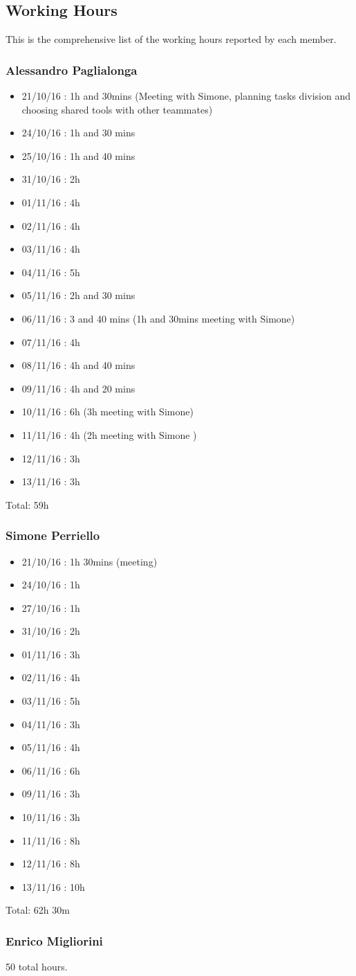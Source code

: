 \clearpage
\subsection{Working Hours}
This is the comprehensive list of the working hours reported by each member.

\subsubsection{Alessandro Paglialonga}
\begin{itemize}
\item21/10/16 : 1h and 30mins (Meeting with Simone, planning tasks division and choosing shared tools with other teammates)
\item24/10/16 : 1h and 30 mins 
\item25/10/16 : 1h and 40 mins
\item31/10/16 : 2h 
\item01/11/16 : 4h
\item02/11/16 : 4h
\item03/11/16 : 4h
\item04/11/16 : 5h
\item05/11/16 : 2h and 30 mins
\item06/11/16 : 3 and 40 mins (1h and 30mins meeting with Simone)
\item07/11/16 : 4h
\item08/11/16 : 4h and 40 mins
\item09/11/16 : 4h and 20 mins
\item10/11/16 : 6h (3h meeting with Simone)
\item11/11/16 : 4h (2h meeting with Simone )
\item12/11/16 : 3h
\item13/11/16 : 3h
\end{itemize}
Total: 59h

\subsubsection{Simone Perriello}
\begin{itemize}
\item21/10/16 : 1h 30mins (meeting)
\item24/10/16 : 1h 
\item27/10/16 : 1h
\item31/10/16 : 2h 
\item01/11/16 : 3h
\item02/11/16 : 4h
\item03/11/16 : 5h
\item04/11/16 : 3h
\item05/11/16 : 4h
\item06/11/16 : 6h
\item09/11/16 : 3h
\item10/11/16 : 3h
\item11/11/16 : 8h
\item12/11/16 : 8h
\item13/11/16 : 10h 
\end{itemize}
Total: 62h 30m

\subsubsection{Enrico Migliorini}
50 total hours.